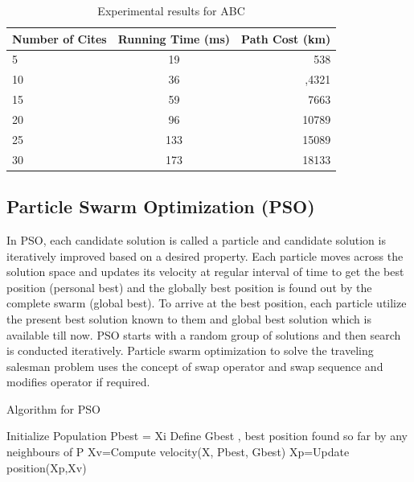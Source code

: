 \documentclass[conference]{IEEEtran}
\begin{document}
\begin{table}[h!]
  \begin{center}
    
    \begin{tabular}{l|c|r}
      \textbf{Number of Cites} & \textbf{Running Time (ms)} & \textbf{Path Cost (km)}\\
      \hline
      5 & 19 & 538\\
      10 & 36& ,4321\\
      15 & 59  & 7663\\
      20 & 96  & 10789\\ 
      25 & 133 & 15089\\
      30 & 173  & 18133\\
    \end{tabular}

    \caption{Experimental results for ABC}
  \end{center}
\end{table}


\subsection {Particle Swarm Optimization (PSO)}
In PSO, each candidate solution is called a particle and candidate solution is iteratively improved based on a desired property. Each particle moves across the solution space and  updates its velocity at regular interval of time to get the best position (personal best) and the globally best position is found out by the complete swarm (global best). To arrive at the best position, each particle utilize the present best solution known to them and global best solution which is available till now. PSO starts with a random group of solutions and then search is conducted iteratively. Particle swarm optimization to solve the traveling salesman problem uses the concept of swap operator and swap sequence and modifies operator if required. 

\begin{algorithm}[H]
\caption{Algorithm for PSO}
\begin{algorithmic}[1]
\STATE Initialize Population
\REPEAT
{}
\STATE Pbest = Xi
\ENDIF
\ENDFOR 
\STATE Define Gbest , best position found so far by any neighbours of P
\STATE Xv=Compute velocity(X, Pbest, Gbest)
\STATE Xp=Update position(Xp,Xv)
\ENDFOR
{} 
\end{algorithmic}
\end{algorithm} 
\end{document}
